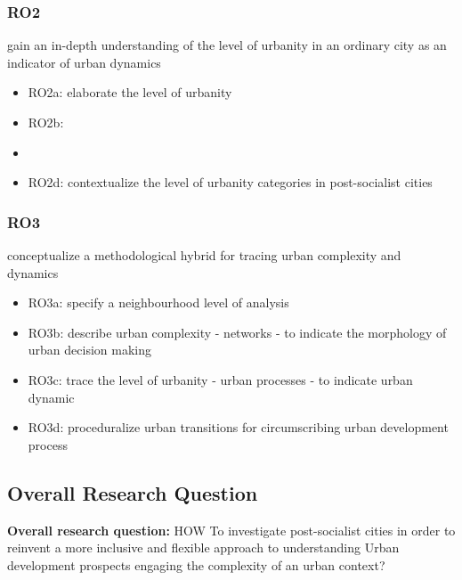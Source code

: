 \documentclass[11pt]{report}
\begin{document}
\subsubsection{RO2}
gain an in-depth understanding of the level of urbanity in an ordinary city as an indicator of urban dynamics
\begin{itemize}
\item RO2a: elaborate the level of urbanity 
\item RO2b:  
\item {}
\item RO2d: contextualize the level of urbanity categories  in post-socialist cities 
\end{itemize}

\subsubsection{RO3}
conceptualize a methodological hybrid for tracing urban complexity and dynamics
\begin{itemize}
\item RO3a: specify a neighbourhood level of analysis 
\item RO3b: describe urban complexity - networks - to indicate the morphology of urban decision making
\item RO3c: trace the level of urbanity - urban processes - to indicate urban dynamic
\item RO3d: proceduralize urban transitions for circumscribing urban development process
\end{itemize}

\subsection{Overall Research Question}

\textbf{Overall research question:} HOW To investigate  post-socialist cities in order to reinvent a more inclusive and flexible approach to understanding Urban development prospects engaging the complexity of an urban context? 
\end{document}
